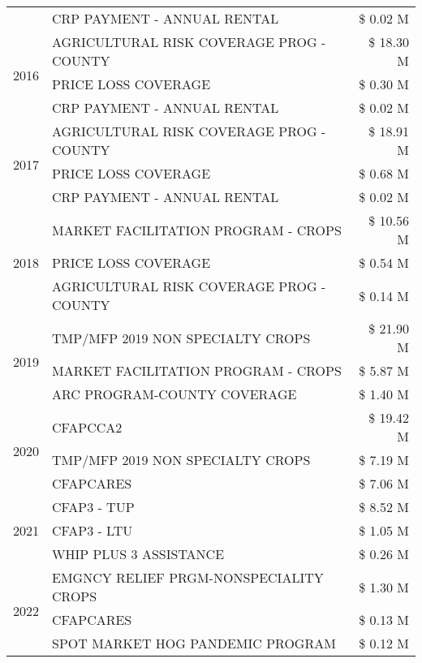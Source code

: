 \begin{tabular}{llr}
 & CRP PAYMENT - ANNUAL RENTAL & \$ 0.02 M \\
\cline{1-3}
\multirow[t]{3}{*}{2016} & AGRICULTURAL RISK COVERAGE PROG - COUNTY & \$ 18.30 M \\
 & PRICE LOSS COVERAGE & \$ 0.30 M \\
 & CRP PAYMENT - ANNUAL RENTAL & \$ 0.02 M \\
\cline{1-3}
\multirow[t]{3}{*}{2017} & AGRICULTURAL RISK COVERAGE PROG - COUNTY & \$ 18.91 M \\
 & PRICE LOSS COVERAGE & \$ 0.68 M \\
 & CRP PAYMENT - ANNUAL RENTAL & \$ 0.02 M \\
\cline{1-3}
\multirow[t]{3}{*}{2018} & MARKET FACILITATION PROGRAM - CROPS & \$ 10.56 M \\
 & PRICE LOSS COVERAGE & \$ 0.54 M \\
 & AGRICULTURAL RISK COVERAGE PROG - COUNTY & \$ 0.14 M \\
\cline{1-3}
\multirow[t]{3}{*}{2019} & TMP/MFP 2019 NON SPECIALTY CROPS & \$ 21.90 M \\
 & MARKET FACILITATION PROGRAM - CROPS & \$ 5.87 M \\
 & ARC PROGRAM-COUNTY COVERAGE & \$ 1.40 M \\
\cline{1-3}
\multirow[t]{3}{*}{2020} & CFAPCCA2 & \$ 19.42 M \\
 & TMP/MFP 2019 NON SPECIALTY CROPS & \$ 7.19 M \\
 & CFAPCARES & \$ 7.06 M \\
\cline{1-3}
\multirow[t]{3}{*}{2021} & CFAP3 - TUP & \$ 8.52 M \\
 & CFAP3 - LTU & \$ 1.05 M \\
 & WHIP PLUS 3 ASSISTANCE & \$ 0.26 M \\
\cline{1-3}
\multirow[t]{3}{*}{2022} & EMGNCY RELIEF PRGM-NONSPECIALITY CROPS & \$ 1.30 M \\
 & CFAPCARES & \$ 0.13 M \\
 & SPOT MARKET HOG PANDEMIC PROGRAM & \$ 0.12 M \\
\cline{1-3}
\bottomrule
\end{tabular}
